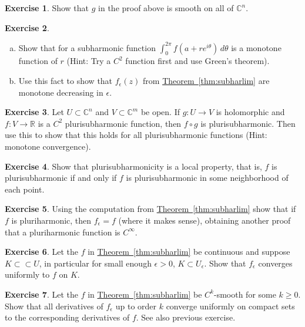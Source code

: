 \documentclass[12pt,openany]{book}
\newcommand{\C}{{\mathbb{C}}}
\newcommand{\R}{{\mathbb{R}}}
\theoremstyle{plain}
\theoremstyle{remark}
\theoremstyle{definition}
\newenvironment{exbox}{%
    \def\FrameCommand{\vrule width 1pt \relax\hspace {10pt}}%
    \MakeFramed {\advance \hsize -\width \FrameRestore }%
}{%
    \endMakeFramed
}
\newenvironment{exparts}{%
    \leavevmode\begin{enumerate}[a),noitemsep,topsep=0pt,parsep=0pt,partopsep=0pt]
}{%
    \end{enumerate}
}
\theoremstyle{exercise}
\newtheorem{exercise}{Exercise}[section]
\theoremstyle{example}
\newcommand{\thmref}[1]{\hyperref[#1]{Theorem~\ref*{#1}}}
\begin{document}
\begin{exbox}
\begin{exercise}
Show that $g$ in the proof above is smooth on all of $\C^n$.
\end{exercise}

\begin{exercise}
\begin{exparts}
\item
Show that for a subharmonic function $\int_0^{2\pi} f(a+re^{i\theta}) \,
d\theta$ is a monotone function of $r$ (Hint: Try a $C^2$ function first and
use Green's theorem).
\item
Use this
fact to show that $f_\epsilon(z)$ from \thmref{thm:subharlim} are monotone
decreasing in $\epsilon$.
\end{exparts}
\end{exercise}

\begin{exercise}
Let $U \subset \C^n$
and $V \subset \C^m$ be open.
If $g \colon U \to V$ is holomorphic and $f
\colon V \to \R$ is a $C^2$ plurisubharmonic function, then 
$f \circ g$ is plurisubharmonic.
Then use this to show that
this holds for all plurisubharmonic functions (Hint: monotone convergence).
\end{exercise}

\begin{exercise}
Show that plurisubharmonicity is a local property, that is,
$f$ is plurisubharmonic if and only if $f$ is plurisubharmonic in
some neighborhood of each point.
\end{exercise}

\begin{exercise}
Using the computation from
\thmref{thm:subharlim} show that if $f$ is pluriharmonic, then
$f_\epsilon = f$ (where it makes sense), obtaining another proof that 
a pluriharmonic function is $C^\infty$.
\end{exercise}

\begin{exercise}
Let the $f$ in \thmref{thm:subharlim} be continuous and suppose $K \subset
\subset U$, in particular for small enough $\epsilon >0$, $K \subset U_\epsilon$.
Show that $f_\epsilon$ converges uniformly to $f$ on $K$.
\end{exercise}

\begin{exercise}
Let the $f$ in \thmref{thm:subharlim} be $C^k$-smooth for some $k \geq 0$.
Show that all derivatives of $f_\epsilon$ up to order $k$ converge uniformly
on compact sets to the corresponding derivatives of $f$.  See also previous
exercise.
\end{exercise}
\end{exbox}
\end{document}
